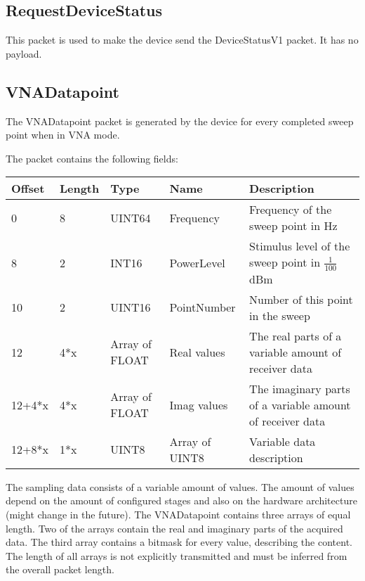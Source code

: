 \documentclass[a4paper,11pt]{article}
\begin{document}
\subsection{RequestDeviceStatus}
This packet is used to make the device send the DeviceStatusV1 packet. It has no payload.

\subsection{VNADatapoint}
The VNADatapoint packet is generated by the device for every completed sweep point when in VNA mode.

The packet contains the following fields:
\begin{ThreePartTable}
\setlength\tabcolsep{3pt}

\begin{longtable}{p{} |  p{}  |  p{}| p{} | p{}}
\toprule
\textbf{Offset} &\textbf{Length} &\textbf{Type} & \textbf{Name} &\textbf{Description} \\ 
\hline
\endhead
\midrule[\heavyrulewidth]
\endfoot  
\midrule[\heavyrulewidth]
\endlastfoot

0 & 8 & UINT64 & Frequency & Frequency of the sweep point in Hz\\
8 & 2 & INT16 & PowerLevel & Stimulus level of the sweep point in $\frac{1}{100}$dBm \\
10 & 2 & UINT16 & PointNumber & Number of this point in the sweep \\
12 & 4*x & Array of FLOAT & Real values & The real parts of a variable amount of receiver data \\
12+4*x & 4*x & Array of FLOAT & Imag values & The imaginary parts of a variable amount of receiver data \\
12+8*x & 1*x & UINT8 & Array of UINT8 & Variable data description \\
\end{longtable}   
\end{ThreePartTable}

The sampling data consists of a variable amount of values. The amount of values depend on the amount of configured stages and also on the hardware architecture (might change in the future). The VNADatapoint contains three arrays of equal length. Two of the arrays contain the real and imaginary parts of the acquired data. The third array contains a bitmask for every value, describing the content. The length of all arrays is not explicitly transmitted and must be inferred from the overall packet length.
\end{document}
